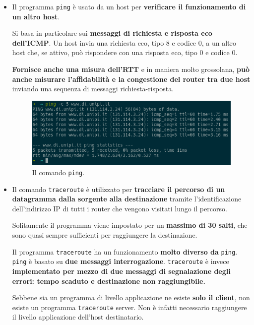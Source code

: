 \documentclass[11pt,a4paper,oneside]{book}
\theoremstyle{definition}
\begin{document}
\begin{itemize}

	\item Il programma \texttt{ping} è usato da un host per \textbf{verificare il funzionamento di un altro host}.

	      Si basa in particolare sui \textbf{messaggi di richiesta e risposta eco dell’ICMP}. Un host invia una richiesta eco, tipo 8 e codice 0,  a un altro host che, se attivo, può rispondere con una risposta eco, tipo 0 e codice 0.

	      \textbf{Fornisce anche una misura dell’RTT} e in maniera molto grossolana, \textbf{può anche misurare l’affidabilità e la congestione del router tra due host} inviando una sequenza di messaggi richiesta-risposta.

	      \begin{figure}[!h]
		      \includegraphics[scale=2.2]{Immagini/PING.png}
		      \centering
		      \caption{Il comando \texttt{ping}.}
	      \end{figure}

	      \pagebreak

	\item Il comando \texttt{traceroute} è  utilizzato per \textbf{tracciare il percorso di un
		      datagramma dalla sorgente alla destinazione} tramite l’identificazione dell’indirizzo IP di tutti i router che vengono visitati lungo il percorso.

	      Solitamente il programma viene impostato per un \textbf{massimo di 30 salti}, che sono quasi sempre sufficienti per raggiungere la destinazione.

	      Il programma \texttt{traceroute} ha un funzionamento \textbf{molto diverso da} \texttt{ping}. \texttt{ping} è basato su \textbf{due messaggi interrogazione}. \texttt{traceroute} è invece \textbf{implementato per mezzo di due messaggi di segnalazione degli errori: tempo scaduto e
		      destinazione non raggiungibile.}

	      Sebbene sia un programma di livello applicazione ne esiste \textbf{solo il client}, non esiste un programma \texttt{traceroute} server. Non è infatti necessario raggiungere il livello applicazione dell'host destinatario.


\end{itemize}
\end{document}
